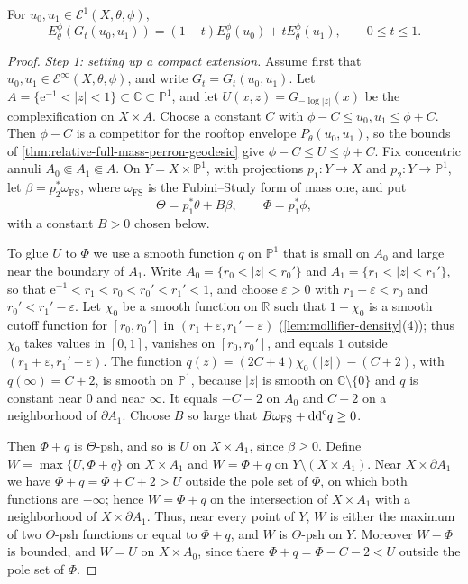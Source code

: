 \begin{theorem}\label{thm:relative-geodesic-energy-affine}
For $u_0,u_1\in\mathcal E^1(X,\theta,\phi)$,
\[
 E_\theta^\phi(G_t(u_0,u_1))
             =(1-t)E_\theta^\phi(u_0)+tE_\theta^\phi(u_1),
                   \qquad0\leq t\leq1.
\]
\end{theorem}
\begin{proof}
\emph{Step 1: setting up a compact extension.} Assume first that $u_0,u_1\in\mathcal E^\infty(X,\theta,\phi)$, and write $G_t=G_t(u_0,u_1)$. Let $A=\{\mathrm e^{-1}<|z|<1\}\subset\mathbb C\subset\mathbb P^1$, and let $U(x,z)=G_{-\log|z|}(x)$ be the complexification on $X\times A$. Choose a constant $C$ with $\phi-C\leq u_0,u_1\leq\phi+C$. Then $\phi-C$ is a competitor for the rooftop envelope $P_\theta(u_0,u_1)$, so the bounds of \cref{thm:relative-full-mass-perron-geodesic} give $\phi-C\leq U\leq\phi+C$. Fix concentric annuli $A_0\Subset A_1\Subset A$. On $Y=X\times\mathbb P^1$, with projections $p_1\colon Y\to X$ and $p_2\colon Y\to\mathbb P^1$, let $\beta=p_2^*\omega_{\mathrm{FS}}$, where $\omega_{\mathrm{FS}}$ is the Fubini--Study form of mass one, and put
\[
 \Theta=p_1^*\theta+B\beta,\qquad\Phi=p_1^*\phi,
\]
with a constant $B>0$ chosen below.

To glue $U$ to $\Phi$ we use a smooth function $q$ on $\mathbb P^1$ that is small on $A_0$ and large near the boundary of $A_1$. Write $A_0=\{r_0<|z|<r_0'\}$ and $A_1=\{r_1<|z|<r_1'\}$, so that $\mathrm e^{-1}<r_1<r_0<r_0'<r_1'<1$, and choose $\varepsilon>0$ with $r_1+\varepsilon<r_0$ and $r_0'<r_1'-\varepsilon$. Let $\chi_0$ be a smooth function on $\mathbb R$ such that $1-\chi_0$ is a smooth cutoff function for $[r_0,r_0']$ in $(r_1+\varepsilon,r_1'-\varepsilon)$ (\cref{lem:mollifier-density}(4)); thus $\chi_0$ takes values in $[0,1]$, vanishes on $[r_0,r_0']$, and equals $1$ outside $(r_1+\varepsilon,r_1'-\varepsilon)$. The function $q(z)=(2C+4)\chi_0(|z|)-(C+2)$, with $q(\infty)=C+2$, is smooth on $\mathbb P^1$, because $|z|$ is smooth on $\mathbb C\setminus\{0\}$ and $q$ is constant near $0$ and near $\infty$. It equals $-C-2$ on $A_0$ and $C+2$ on a neighborhood of $\partial A_1$. Choose $B$ so large that $B\omega_{\mathrm{FS}}+\mathrm{dd}^{\mathrm{c}} q\geq0$.

Then $\Phi+q$ is $\Theta$-psh, and so is $U$ on $X\times A_1$, since $\beta\geq0$. Define $W=\max\{U,\Phi+q\}$ on $X\times A_1$ and $W=\Phi+q$ on $Y\setminus(X\times A_1)$. Near $X\times\partial A_1$ we have $\Phi+q=\Phi+C+2>U$ outside the pole set of $\Phi$, on which both functions are $-\infty$; hence $W=\Phi+q$ on the intersection of $X\times A_1$ with a neighborhood of $X\times\partial A_1$. Thus, near every point of $Y$, $W$ is either the maximum of two $\Theta$-psh functions or equal to $\Phi+q$, and $W$ is $\Theta$-psh on $Y$. Moreover $W-\Phi$ is bounded, and $W=U$ on $X\times A_0$, since there $\Phi+q=\Phi-C-2<U$ outside the pole set of $\Phi$.


\end{proof}
